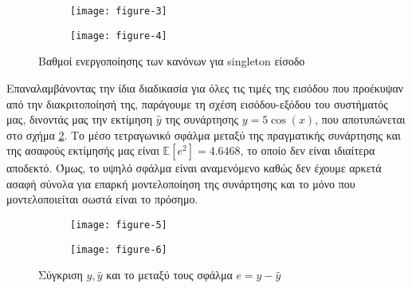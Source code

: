 \documentclass[11pt,a4paper,titlepage, oneside]{article}
\begin{document}
	\begin{figure}[h]
		\centering
		\begin{subfigure}[c]{0.495\textwidth}
			\texttt{[image: figure-3]}
		\end{subfigure}
		\begin{subfigure}[c]{0.495\textwidth}
			\texttt{[image: figure-4]}
		\end{subfigure}
		\caption{Βαθμοί ενεργοποίησης των κανόνων για singleton είσοδο}
		\label{fig:fuzzy_set_firings_1}
	\end{figure}
	
	Επαναλαμβάνοντας την ίδια διαδικασία για όλες τις τιμές της εισόδου που προέκυψαν από την διακριτοποίησή της, παράγουμε τη σχέση εισόδου-εξόδου του συστήματός μας, δινοντάς μας την εκτίμηση $\hat{y}$ της συνάρτησης $y = 5 \cos(x)$, που αποτυπώνεται στο σχήμα \ref{fig:xy_relations_1}. Το μέσο τετραγωνικό σφάλμα μεταξύ της πραγματικής συνάρτησης και της ασαφούς εκτίμησής μας είναι $\mathbb{E}[e^2] = 4.6468$, το οποίο δεν είναι ιδιαίτερα αποδεκτό. Όμως, το υψηλό σφάλμα είναι αναμενόμενο καθώς δεν έχουμε αρκετά ασαφή σύνολα για επαρκή μοντελοποίηση της συνάρτησης και το μόνο που μοντελοποιείται σωστά είναι το πρόσημο.
		
	\begin{figure}[h]
		\centering
		\begin{subfigure}[c]{0.495\textwidth}
			\texttt{[image: figure-5]}
		\end{subfigure}
		\begin{subfigure}[c]{0.495\textwidth}
			\texttt{[image: figure-6]}
		\end{subfigure}
		\caption{Σύγκριση $y, \hat{y}$ και το μεταξύ τους σφάλμα $e = y - \hat{y}$}
		\label{fig:xy_relations_1}
	\end{figure}
	
\end{document}
